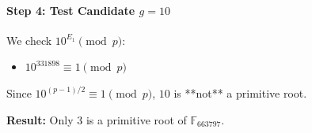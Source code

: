 \begin{solution}
\paragraph{Step 4: Test Candidate $g=10$}
We check $10^{E_1} \pmod{p}$:
\begin{itemize}
    \item $10^{331898} \equiv 1 \pmod{p}$
\end{itemize}
Since $10^{(p-1)/2} \equiv 1 \pmod{p}$, $10$ is **not** a primitive root.

\textbf{Result:} Only $3$ is a primitive root of $\mathbb{F}_{663797}$.
\end{solution}